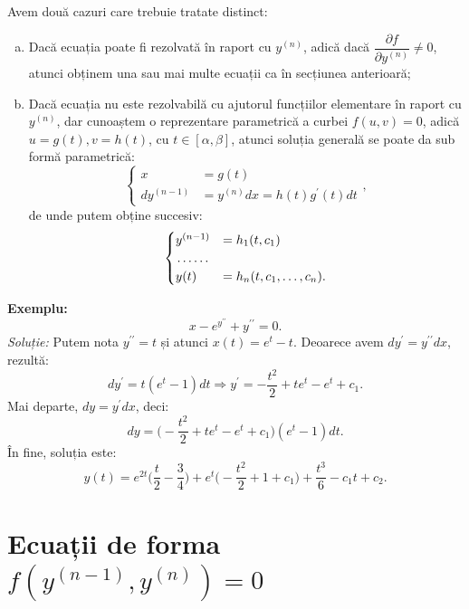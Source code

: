 Avem două cazuri care trebuie tratate distinct:
\begin{enumerate}[(a)]
  \item Dacă ecuația poate fi rezolvată în raport cu $ y^{(n)} $, adică dacă
    $ \dfrac{\partial f}{\partial y^{(n)}} \neq 0 $, atunci obținem una
      sau mai multe ecuații ca în secțiunea anterioară;
    \item Dacă ecuația nu este rezolvabilă cu ajutorul funcțiilor elementare
      în raport cu $ y^{(n)} $, dar cunoaștem o reprezentare parametrică
      a curbei $ f(u, v) = 0 $, adică $ u = g(t), v = h(t) $, cu
      $ t \in [\alpha, \beta] $, atunci soluția generală se poate da sub formă
      parametrică:
      \[
        \begin{cases}
          x &= g(t) \\
          dy^{(n-1)} &= y^{(n)} dx = h(t) g^{\prime}(t) dt
        \end{cases},
      \]
      de unde putem obține succesiv:
      \[
        \begin{cases}
          y^{(n-1)}  &= h_1(t, c_1) \\
             \dotfill \\
          y(t) &= h_n(t, c_1, \dots, c_n).
        \end{cases}
      \]
\end{enumerate}

\textbf{Exemplu:}
\[
  x - e^{y^{\prime\prime}} + y^{\prime\prime} = 0.
\]
\emph{Soluție:} Putem nota $ y^{\prime\prime} = t $ și atunci $ x(t) = e^t - t $.
Deoarece avem $ dy^{\prime} = y^{\prime\prime} dx $, rezultă:
\[
  dy^{\prime} = t(e^t - 1) dt \Rightarrow y^{\prime} = -\dfrac{t^2}{2} + te^t - e^t + c_1.
\]
Mai departe, $ dy = y^{\prime} dx $, deci:
\[
  dy = \Big( - \dfrac{t^2}{2} + te^t - e^t + c_1 \Big)(e^t - 1) dt.
\]
În fine, soluția este:
\[
  y(t) = e^{2t} \Big( \dfrac{t}{2} - \dfrac{3}{4} \Big) + e^t \Big( - \dfrac{t^2}{2} + %
  1 + c_1 \Big) + \dfrac{t^3}{6} - c_1 t + c_2.
\]


\section{Ecuații de forma $ f(y^{(n-1)}, y^{(n)}) = 0 $}

